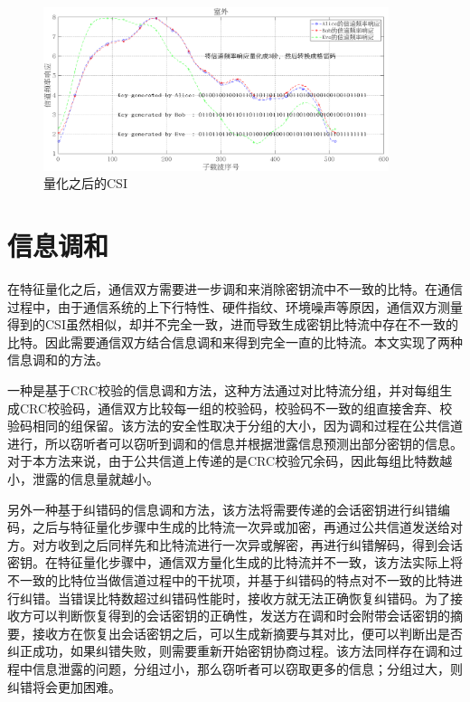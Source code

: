 \documentclass[master]{seuthesis} %
\begin{document}
\begin{Main}
\begin{figure}[htbp!]
    \centering \includegraphics[width=0.9\textwidth]{images/quantization_and_csi} 
    \caption{量化之后的CSI}
    \label{quantization_and_csi}
\end{figure}

\section{信息调和}

在特征量化之后，通信双方需要进一步调和来消除密钥流中不一致的比特。在通信过程中，由于通信系统的上下行特性、硬件指纹、环境噪声等原因，通信双方测量得到的CSI虽然相似，却并不完全一致，进而导致生成密钥比特流中存在不一致的比特。因此需要通信双方结合信息调和来得到完全一直的比特流。本文实现了两种信息调和的方法。

一种是基于CRC校验的信息调和方法，这种方法通过对比特流分组，并对每组生成CRC校验码，通信双方比较每一组的校验码，校验码不一致的组直接舍弃、校验码相同的组保留。该方法的安全性取决于分组的大小，因为调和过程在公共信道进行，所以窃听者可以窃听到调和的信息并根据泄露信息预测出部分密钥的信息。对于本方法来说，由于公共信道上传递的是CRC校验冗余码，因此每组比特数越小，泄露的信息量就越小。

另外一种基于纠错码的信息调和方法，该方法将需要传递的会话密钥进行纠错编码，之后与特征量化步骤中生成的比特流一次异或加密，再通过公共信道发送给对方。对方收到之后同样先和比特流进行一次异或解密，再进行纠错解码，得到会话密钥。在特征量化步骤中，通信双方量化生成的比特流并不一致，该方法实际上将不一致的比特位当做信道过程中的干扰项，并基于纠错码的特点对不一致的比特进行纠错。当错误比特数超过纠错码性能时，接收方就无法正确恢复纠错码。为了接收方可以判断恢复得到的会话密钥的正确性，发送方在调和时会附带会话密钥的摘要，接收方在恢复出会话密钥之后，可以生成新摘要与其对比，便可以判断出是否纠正成功，如果纠错失败，则需要重新开始密钥协商过程。该方法同样存在调和过程中信息泄露的问题，分组过小，那么窃听者可以窃取更多的信息；分组过大，则纠错将会更加困难\cite{李古月2014无线信道的密钥生成方法}。


\end{Main}
\end{document}
